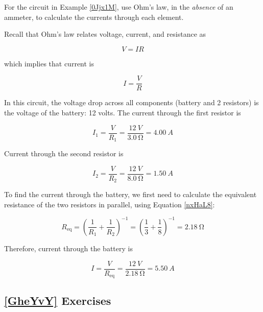 \documentclass[main.tex]{subfiles}
\begin{document}
\vspace{1em}

\cyanhrule

\begin{example}
    For the circuit in Example \ref{0Jjx1M}, use Ohm's law, in the \textit{absence} of an ammeter, to calculate the currents through each element.
\end{example}

\Solution Recall that Ohm's law relates voltage, current, and resistance as

\begin{equation*}
    V = I R
\end{equation*}

which implies that current is

\begin{equation*}
    I = \frac{V}{R}
\end{equation*}

In this circuit, the voltage drop across all components (battery and 2 resistors) is the voltage of the battery: 12 volts. The current through the first resistor is

\begin{equation*}
        I_1 = \frac{V}{R_1} = \frac{\SI{12}{V}}{\SI{3.0}{\ohm}} =  \SI{4.00}{A}
\end{equation*}

Current through the second resistor is

\begin{equation*}
    I_2 = \frac{V}{R_2} = \frac{\SI{12}{V}}{\SI{8.0}{\ohm}} = \SI{1.50}{A}
\end{equation*}

To find the current through the battery, we first need to calculate the equivalent resistance of the two resistors in parallel, using Equation \ref{nxHaL8}:

\begin{equation*}
    R_{\mathrm{eq}} = \left(\frac{1}{R_1} + \frac{1}{R_2}\right)^{-1} = \left(\frac{1}{3} + \frac{1}{8}\right)^{-1} = \SI{2.18}{\ohm}
\end{equation*}

Therefore, current through the battery is

\begin{equation*}
    I = \frac{V}{R_{\text{eq}}} = \frac{\SI{12}{V}}{\SI{2.18}{\ohm}} = \SI{5.50}{A}
\end{equation*}

\cyanhrule

\subsection*{\ref{GheYvY} Exercises}
\end{document}
